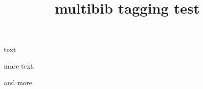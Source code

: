 \documentclass{article}
\title{multibib tagging test}
\begin{document}
text 

more text.

and more \cite{manual-full}

\renewcommand{\refname}{Postscript References}


\end{document}
